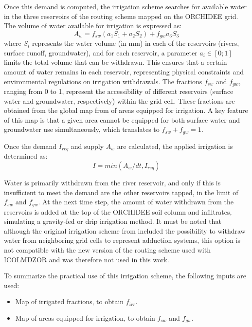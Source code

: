 Once this demand is computed, the irrigation scheme searches for available water in the three reservoirs of the routing scheme mapped on the ORCHIDEE grid.
The volume of water available for irrigation is expressed as:
\begin{equation}
    A_w = f_{sw} (a_1 S_1 + a_2 S_2)+ f_{gw}a_3 S_3
\end{equation}
where $S_i$ represents the water volume (in mm) in each of the reservoirs (rivers, surface runoff, groundwater), and for each reservoir, a parameter $a_i \in [0;1]$ limits the total volume that can be withdrawn. This ensures that a certain amount of water remains in each reservoir, representing physical constraints and environmental regulations on irrigation withdrawals.
The fractions $f_{sw}$ and $f_{gw}$, ranging from 0 to 1, represent the accessibility of different reservoirs (surface water and groundwater, respectively) within the grid cell. These fractions are obtained from the global map from \citet{siebert_groundwater_2010} of areas equipped for irrigation. A key feature of this map is that a given area cannot be equipped for both surface water and groundwater use simultaneously, which translates to $f_{sw} + f_{gw} =1$.

Once the demand $I_{req}$ and supply $A_w$ are calculated, the applied irrigation is determined as:
\begin{equation}
    I = min(A_w/dt, I_{req})
\end{equation}

Water is primarily withdrawn from the river reservoir, and only if this is insufficient to meet the demand are the other reservoirs tapped, in the limit of $f_{sw}$ and $f_{gw}$.
At the next time step, the amount of water withdrawn from the reservoirs is added at the top of the ORCHIDEE soil column and infiltrates, simulating a gravity-fed or drip irrigation method.
It must be noted that although the original irrigation scheme from \citet{arboleda-obando_validation_2024} included the possibility to withdraw water from neighboring grid cells to represent adduction systems, this option is not compatible with the new version of the routing scheme used with ICOLMDZOR and was therefore not used in this work.

To summarize the practical use of this irrigation scheme, the following inputs are used:
\begin{itemize}
    \item Map of irrigated fractions, to obtain $f_{irr}$.
    \item Map of areas equipped for irrigation, to obtain $f_{sw}$ and $f_{gw}$.
\end{itemize}

